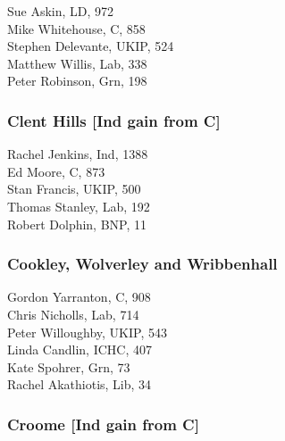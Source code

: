 \documentclass[a4paper,openany,10pt]{book}
\begin{document}


Sue Askin, LD, 972\\
Mike Whitehouse, C, 858\\
Stephen Delevante, UKIP, 524\\
Matthew Willis, Lab, 338\\
Peter Robinson, Grn, 198\\


\subsubsection*{Clent Hills \hspace*{\fill}\nolinebreak[1]%
\enspace\hspace*{\fill}
[Ind gain from C]}



Rachel Jenkins, Ind, 1388\\
Ed Moore, C, 873\\
Stan Francis, UKIP, 500\\
Thomas Stanley, Lab, 192\\
Robert Dolphin, BNP, 11\\


\subsubsection*{Cookley, Wolverley and Wribbenhall}



Gordon Yarranton, C, 908\\
Chris Nicholls, Lab, 714\\
Peter Willoughby, UKIP, 543\\
Linda Candlin, ICHC, 407\\
Kate Spohrer, Grn, 73\\
Rachel Akathiotis, Lib, 34\\


\subsubsection*{Croome \hspace*{\fill}\nolinebreak[1]%
\enspace\hspace*{\fill}
[Ind gain from C]}
\end{document}
